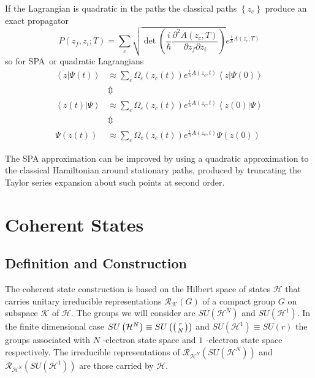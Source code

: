 \documentclass[aps,preprint]{revtex4}%
\begin{document}
If the Lagrangian is quadratic in the paths the classical paths $\left\{
z_{c}\right\}  $ produce an exact propagator
\begin{equation}
P\left(  z_{f},z_{i};T\right)  =\sum_{c}\sqrt{\det\left(  \frac{i}{\hslash
}\frac{\partial^{2}A\left(  z_{c},T\right)  }{\partial z_{f}\partial z_{i}%
}\right)  }e^{\frac{i}{\hslash}A\left(  z_{c},T\right)  }%
\end{equation}
so for SPA\ or quadratic Lagrangians%
\begin{align}
\left\langle \left.  z\right\vert \Psi\left(  t\right)  \right\rangle  &
\approx\sum_{c}\Omega_{c}\left(  z_{c}\left(  t\right)  \right)  e^{\frac
{i}{\hslash}A\left(  z_{c},t\right)  }\left\langle \left.  z\right\vert
\Psi\left(  0\right)  \right\rangle \nonumber\\
&  \Updownarrow\nonumber\\
\left\langle \left.  z\left(  t\right)  \right\vert \Psi\right\rangle  &
\approx\sum_{c}\Omega_{c}\left(  z_{c}\left(  t\right)  \right)  e^{\frac
{i}{\hslash}A\left(  z_{c},t\right)  }\left\langle \left.  z\left(  0\right)
\right\vert \Psi\right\rangle \nonumber\\
&  \Updownarrow\nonumber\\
\Psi\left(  z\left(  t\right)  \right)   &  \approx\sum_{c}\Omega_{c}\left(
z_{c}\left(  t\right)  \right)  e^{\frac{i}{\hslash}A\left(  z_{c},t\right)
}\Psi\left(  z\left(  0\right)  \right)
\end{align}


The SPA approximation can be improved by using a quadratic approximation to
the classical Hamiltonian around stationary paths, produced by truncating the
Taylor series expansion about such points at second order.

\section{Coherent States\label{cohstate}}

\subsection{Definition and Construction\label{def}}

The coherent state construction is based on the Hilbert space of states
$\mathcal{H}$ that carries unitary irreducible representations $\mathcal{R}%
_{\mathcal{K}}\left(  G\right)  $ of a compact group $G$ on subspace
$\mathcal{K}$ of $\mathcal{H}$. The groups we will consider are $SU\left(
\mathcal{H}^{N}\right)  $ and $SU\left(  \mathcal{H}^{1}\right)  .$ In the
finite dimensional case $SU\left(  \mathcal{H}^{N}\right)  \equiv SU\left(
\left(
\genfrac{}{}{0pt}{}{r}{N}%
\right)  \right)  $ and $SU\left(  \mathcal{H}^{1}\right)  \equiv SU\left(
r\right)  $ the groups associated with $N$ -electron state space and $1$
-electron state space respectively. The irreducible representations of
$\mathcal{R}_{\mathcal{H}^{N}}\left(  SU\left(  \mathcal{H}^{N}\right)
\right)  $ and $\mathcal{R}_{\mathcal{H}^{N}}\left(  SU\left(  \mathcal{H}%
^{1}\right)  \right)  $ are those carried by $\mathcal{H}.$
\end{document}
